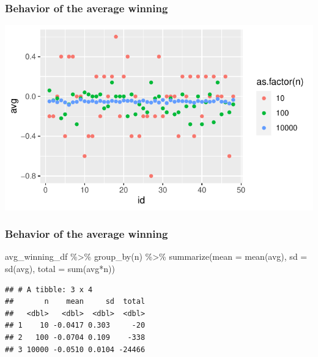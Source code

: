 \documentclass[
  ignorenonframetext,
]{beamer}
\newenvironment{Shaded}{\begin{snugshade}}{\end{snugshade}}
\newcommand{\AttributeTok}[1]{\textcolor[rgb]{0.77,0.63,0.00}{#1}}
\newcommand{\FunctionTok}[1]{\textcolor[rgb]{0.00,0.00,0.00}{#1}}
\newcommand{\NormalTok}[1]{#1}
\newcommand{\SpecialCharTok}[1]{\textcolor[rgb]{0.00,0.00,0.00}{#1}}
\begin{document}
\begin{frame}
\frametitle{Behavior of the average winning}
\tiny

\begin{center}\includegraphics[width=1\linewidth]{Probability_Statistics_101_v2_files/figure-beamer/unnamed-chunk-9-1} \end{center}
\end{frame}

\begin{frame}[fragile]
\frametitle{Behavior of the average winning}

\begin{Shaded}
\begin{Highlighting}[]
\NormalTok{avg\_winning\_df }\SpecialCharTok{\%\textgreater{}\%}
  \FunctionTok{group\_by}\NormalTok{(n) }\SpecialCharTok{\%\textgreater{}\%}
  \FunctionTok{summarize}\NormalTok{(}\AttributeTok{mean =} \FunctionTok{mean}\NormalTok{(avg),}
            \AttributeTok{sd =} \FunctionTok{sd}\NormalTok{(avg),}
            \AttributeTok{total =} \FunctionTok{sum}\NormalTok{(avg}\SpecialCharTok{*}\NormalTok{n))}
\end{Highlighting}
\end{Shaded}

\begin{verbatim}
## # A tibble: 3 x 4
##       n    mean     sd  total
##   <dbl>   <dbl>  <dbl>  <dbl>
## 1    10 -0.0417 0.303     -20
## 2   100 -0.0704 0.109    -338
## 3 10000 -0.0510 0.0104 -24466
\end{verbatim}
\end{frame}
\end{document}
